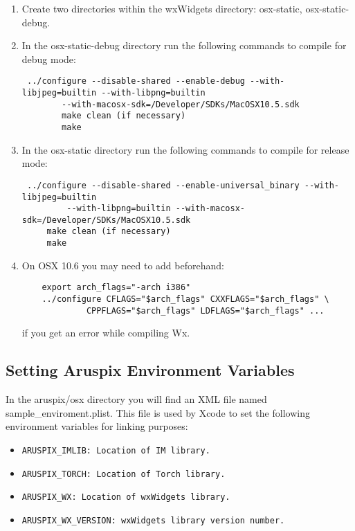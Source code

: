 \documentclass[]{article}
\begin{document}
\begin{enumerate}
	\item Create two directories within the wxWidgets directory: osx-static, osx-static-debug.
	\item In the osx-static-debug directory run the following commands to compile for debug mode:
	\begin{verbatim} ../configure --disable-shared --enable-debug --with-libjpeg=builtin --with-libpng=builtin 
     	--with-macosx-sdk=/Developer/SDKs/MacOSX10.5.sdk
 		make clean (if necessary)
 		make
	\end{verbatim}

	\item In the osx-static directory run the following commands to compile for release mode:
	\begin{verbatim} ../configure --disable-shared --enable-universal_binary --with-libjpeg=builtin
	     --with-libpng=builtin --with-macosx-sdk=/Developer/SDKs/MacOSX10.5.sdk 
	 make clean (if necessary)
	 make
	\end{verbatim}
	\item On OSX 10.6 you may need to add beforehand:
	\begin{verbatim}
	export arch_flags="-arch i386"
	../configure CFLAGS="$arch_flags" CXXFLAGS="$arch_flags" \
             CPPFLAGS="$arch_flags" LDFLAGS="$arch_flags" ...
	\end{verbatim}
	if you get an error while compiling Wx.
\end{enumerate}


\subsection{Setting Aruspix Environment Variables}
	In the aruspix/osx directory you will find an XML file named sample\_enviroment.plist. This
	file is used by Xcode to set the following environment variables for linking purposes:
	\begin{itemize}
		\item \begin{verbatim}ARUSPIX_IMLIB: Location of IM library.\end{verbatim}
		\item \begin{verbatim}ARUSPIX_TORCH: Location of Torch library.\end{verbatim}
		\item \begin{verbatim}ARUSPIX_WX: Location of wxWidgets library.\end{verbatim}
		\item \begin{verbatim}ARUSPIX_WX_VERSION: wxWidgets library version number.\end{verbatim}
	\end{itemize}
\end{document}
